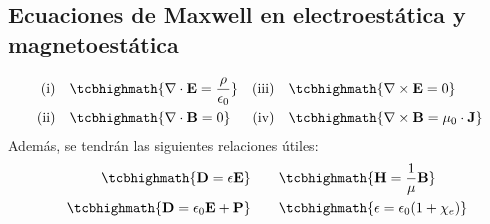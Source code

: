 \documentclass[
  11pt,
  letterpaper,
   answers
  ]{exam}
\begin{document}
\subsection*{Ecuaciones de Maxwell en electroestática y magnetoestática}
\begin{align}
  \text{(i)}&\quad \tcbhighmath{\nabla\cdot \mathbf{E}= \frac{\rho}{\epsilon_0}} & \text{(iii)}&\quad \tcbhighmath{\nabla\times \mathbf{E} = 0}\\
  \text{(ii)}&\quad \tcbhighmath{\nabla\cdot \mathbf{B} = 0} & \text{(iv)}&\quad \tcbhighmath{\nabla\times \mathbf{B} = \mu_0 \cdot \mathbf{J}}
  \end{align}
  Además, se tendrán las siguientes relaciones útiles:
  \begin{align}
      \quad \tcbhighmath{\mathbf{D} = \epsilon \mathbf{E}} &&& \quad \tcbhighmath{\mathbf{H}= \frac{1}{\mu}\mathbf{B}}\\
      \quad \tcbhighmath{\mathbf{D} = \epsilon_0 \mathbf{E} + \mathbf{P}} &&& \quad \tcbhighmath{\epsilon = \epsilon_0 (1+\chi_e)}
  \end{align}
\end{document}

